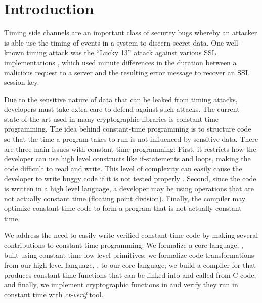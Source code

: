 \section{Introduction}

Timing side channels are an important class of security bugs whereby an attacker
is able use the timing of events in a system to discern secret data. One well-known
timing attack was the ``Lucky 13'' attack against various SSL implementations \cite{al2013lucky},
which used minute differences in the duration between a malicious request to a server and
the resulting error message to recover an SSL session key.

Due to the sensitive nature of data that can be leaked from timing attacks, developers
must take extra care to defend against such attacks. The current state-of-the-art
used in many cryptographic libraries is constant-time programming. The idea behind
constant-time programming is to structure code so that the time a program
takes to run is not influenced by sensitive data. There are three main issues
with constant-time programming: First, it restricts how the developer
can use high level constructs like if-statements and loops, making the code
difficult to read and write. This level of complexity can easily cause the
developer to write buggy code if it is not tested properly \cite{al2013lucky}. Second,
since the code is written in a high level language, a developer may be using operations
that are not actually constant time (\eg floating point division).
Finally, the compiler may optimize constant-time code to form a program
that is not actually constant time.

We address the need to easily write verified constant-time code by making several
contributions to constant-time programming: We formalize a core
language, \ccore, built using constant-time low-level primitives;
we formalize code transformations from our high-level language,
\constc, to our core language; we build a compiler for
\constc that produces constant-time functions that can be linked into and called from C code;
and finally, we implement cryptographic functions in \constc and verify they run in constant time with
\emph{ct-verif} tool\cite{almeida2016}.



